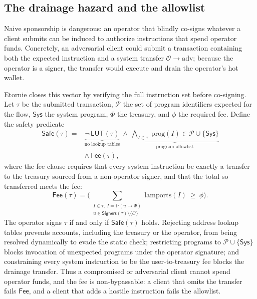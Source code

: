 \documentclass[conference]{IEEEtran}
\begin{document}
\subsection{The drainage hazard and the allowlist}

Naive sponsorship is dangerous: an operator that blindly co-signs whatever a
client submits can be induced to authorize instructions that spend operator
funds. Concretely, an adversarial client could submit a transaction containing
both the expected instruction and a system transfer
$\mathcal{O} \to \mathrm{adv}$; because the operator is a signer, the transfer
would execute and drain the operator's hot wallet.

Etornie closes this vector by verifying the full instruction set before
co-signing. Let $\tau$ be the submitted transaction, $\mathcal{P}$ the set of
program identifiers expected for the flow, $\mathsf{Sys}$ the system program,
$\Phi$ the treasury, and $\phi$ the required fee. Define the safety predicate
\begin{equation}
\begin{aligned}
\mathsf{Safe}(\tau) = {}&
\underbrace{\neg\,\mathsf{LUT}(\tau)}_{\text{no lookup tables}}
\ \wedge\
\underbrace{\bigwedge_{I \in \tau}\ \mathrm{prog}(I) \in \mathcal{P} \cup
\{\mathsf{Sys}\}}_{\text{program allowlist}} \\
&\wedge\ \mathsf{Fee}(\tau),
\end{aligned}
\label{eq:safe}
\end{equation}
where the fee clause requires that every system instruction be exactly a
transfer to the treasury sourced from a non-operator signer, and that the
total so transferred meets the fee:
\begin{equation}
\mathsf{Fee}(\tau) = \Big(\!\!\sum_{\substack{I \in \tau,\ I = \mathsf{tr}(u
\to \Phi)\\ u \in \mathsf{Signers}(\tau)\setminus\{\mathcal{O}\}}}\!\!
\mathrm{lamports}(I)\ \ge\ \phi\Big).
\end{equation}
The operator signs $\tau$ if and only if $\mathsf{Safe}(\tau)$ holds.
Rejecting address lookup tables prevents accounts, including the treasury or
the operator, from being resolved dynamically to evade the static check;
restricting programs to $\mathcal{P} \cup \{\mathsf{Sys}\}$ blocks invocation
of unexpected programs under the operator signature; and constraining every
system instruction to be the user-to-treasury fee blocks the drainage
transfer. Thus a compromised or adversarial client cannot spend operator
funds, and the fee is non-bypassable: a client that omits the transfer fails
$\mathsf{Fee}$, and a client that adds a hostile instruction fails the
allowlist.
\end{document}
